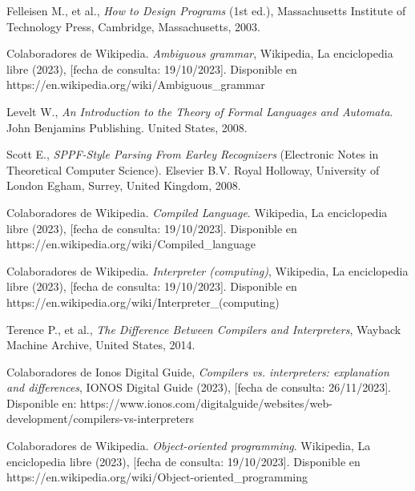 \begin{thebibliography}{11}
    \bibitem{}
    \label{sec:39}
    \hypertarget{39}{}
    Felleisen M.,  et al., \textit{How to Design Programs} (1st ed.),   Massachusetts Institute of Technology Press, Cambridge, Massachusetts, 2003.

    \bibitem{}
    \label{sec:40}
    \hypertarget{40}{}
    Colaboradores de Wikipedia. \textit{Ambiguous grammar}, Wikipedia, La enciclopedia libre (2023), [fecha de consulta: 19/10/2023]. Disponible en https://en.wikipedia.org/wiki/Ambiguous\_grammar

    \bibitem{}
    \label{sec:41}
    \hypertarget{41}{}
    Levelt W., \textit{An Introduction to the Theory of Formal Languages and Automata}. John Benjamins Publishing. United States, 2008.

    \bibitem{}
    \label{sec:42}
    \hypertarget{42}{}
    Scott E., \textit{SPPF-Style Parsing From Earley Recognizers} (Electronic Notes in Theoretical Computer Science). Elsevier B.V. Royal Holloway, University of London
    Egham, Surrey, United Kingdom, 2008. %

    \bibitem{}
    \label{sec:43}
    \hypertarget{43}{}
    Colaboradores de Wikipedia. \textit{Compiled Language}. Wikipedia, La enciclopedia libre (2023), [fecha de consulta: 19/10/2023]. Disponible en https://en.wikipedia.org/wiki/Compiled\_language

    \bibitem{}
    \label{sec:44}
    \hypertarget{44}{}
    Colaboradores de Wikipedia. \textit{Interpreter (computing)}, Wikipedia, La enciclopedia libre (2023), [fecha de consulta: 19/10/2023]. Disponible en https://en.wikipedia.org/wiki/Interpreter\_(computing)

    \bibitem{}
    \label{sec:45}
    \hypertarget{45}{}
    Terence P., et al., \textit{The Difference Between Compilers and Interpreters},  Wayback Machine Archive, United States, 2014.

    \bibitem{}
    \label{sec:46}
    \hypertarget{46}{}
    Colaboradores de Ionos Digital Guide, \textit{Compilers vs. interpreters: explanation and differences}, IONOS Digital Guide (2023), [fecha de consulta: 26/11/2023]. Disponible en: https://www.ionos.com/digitalguide/websites/web-development/compilers-vs-interpreters

    \bibitem{}
    \label{sec:47}
    \hypertarget{47}{}
    Colaboradores de Wikipedia. \textit{Object-oriented programming}. Wikipedia, La enciclopedia libre (2023), [fecha de consulta: 19/10/2023]. Disponible en https://en.wikipedia.org/wiki/Object-oriented\_programming


\end{thebibliography}

